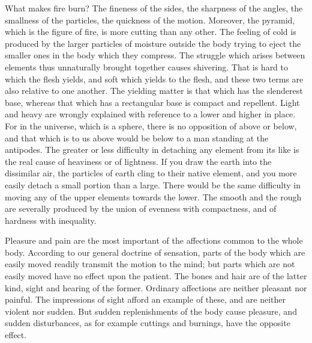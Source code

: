 What makes fire burn? The fineness of the sides, the sharpness of the
angles, the smallness of the particles, the quickness of the motion.
Moreover, the pyramid, which is the figure of fire, is more cutting than
any other. The feeling of cold is produced by the larger particles of
moisture outside the body trying to eject the smaller ones in the body
which they compress. The struggle which arises between elements thus
unnaturally brought together causes shivering. That is hard to which the
flesh yields, and soft which yields to the flesh, and these two terms are
also relative to one another. The yielding matter is that which has the
slenderest base, whereas that which has a rectangular base is compact and
repellent. Light and heavy are wrongly explained with reference to a lower
and higher in place. For in the universe, which is a sphere, there is no
opposition of above or below, and that which is to us above would be below
to a man standing at the antipodes. The greater or less difficulty in
detaching any element from its like is the real cause of heaviness or of
lightness. If you draw the earth into the dissimilar air, the particles of
earth cling to their native element, and you more easily detach a small
portion than a large. There would be the same difficulty in moving any of
the upper elements towards the lower. The smooth and the rough are
severally produced by the union of evenness with compactness, and of
hardness with inequality.

Pleasure and pain are the most important of the affections common to the
whole body. According to our general doctrine of sensation, parts of the
body which are easily moved readily transmit the motion to the mind; but
parts which are not easily moved have no effect upon the patient. The
bones and hair are of the latter kind, sight and hearing of the former.
Ordinary affections are neither pleasant nor painful. The impressions of
sight afford an example of these, and are neither violent nor sudden. But
sudden replenishments of the body cause pleasure, and sudden disturbances,
as for example cuttings and burnings, have the opposite effect.

